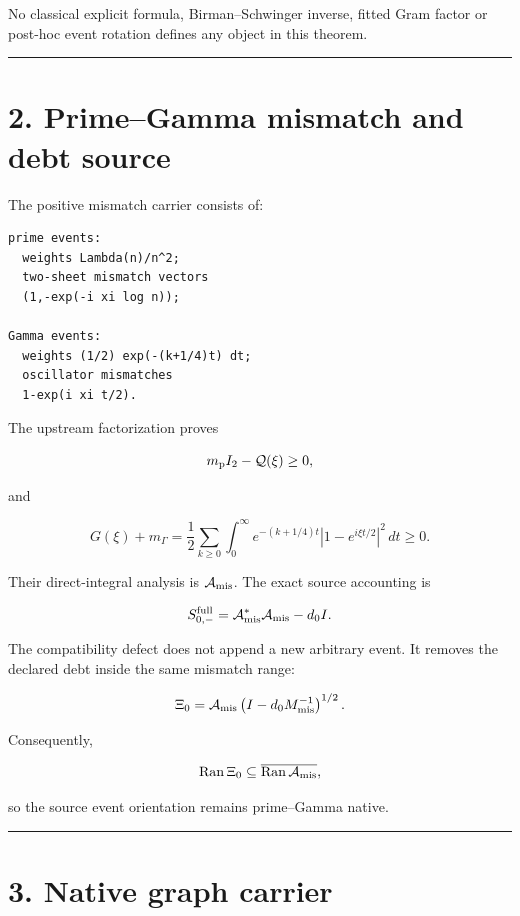 No classical explicit formula, Birman--Schwinger inverse, fitted Gram factor or
post-hoc event rotation defines any object in this theorem.

\begin{center}\rule{0.5\linewidth}{0.5pt}\end{center}

\hypertarget{primegamma-mismatch-and-debt-source}{%
\section{2. Prime--Gamma mismatch and debt source}\label{primegamma-mismatch-and-debt-source}}

The positive mismatch carrier consists of:

\begin{verbatim}
prime events:
  weights Lambda(n)/n^2;
  two-sheet mismatch vectors
  (1,-exp(-i xi log n));

Gamma events:
  weights (1/2) exp(-(k+1/4)t) dt;
  oscillator mismatches
  1-exp(i xi t/2).
\end{verbatim}

The upstream factorization proves

\[
m_{\rm p}I_2-\mathcal Q(\xi)\ge0,
\]

and

\[
G(\xi)+m_\Gamma
=
\frac12
\sum_{k\ge0}\int_0^\infty
e^{-(k+1/4)t}
|1-e^{i\xi t/2}|^2\,dt
\ge0.
\]

Their direct-integral analysis is \(\mathcal A_{\rm mis}\).
The exact source accounting is

\[
S_{0,-}^{\rm full}
=
\mathcal A_{\rm mis}^*\mathcal A_{\rm mis}
-d_0I.
\]

The compatibility defect does not append a new arbitrary event. It removes the
declared debt inside the same mismatch range:

\[
\Xi_0
=
\mathcal A_{\rm mis}
\left(I-d_0M_{\rm mis}^{-1}\right)^{1/2}.
\]

Consequently,

\[
\operatorname{Ran}\Xi_0
\subseteq
\overline{\operatorname{Ran}\mathcal A_{\rm mis}},
\]

so the source event orientation remains prime--Gamma native.

\begin{center}\rule{0.5\linewidth}{0.5pt}\end{center}

\hypertarget{native-graph-carrier}{%
\section{3. Native graph carrier}\label{native-graph-carrier}}

